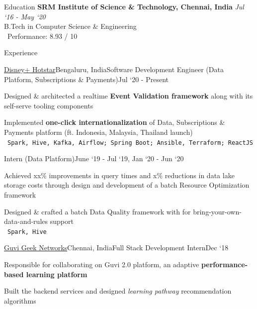\documentclass{resume}
\begin{document}
  \begin{rSection}{Education}
    {\bf SRM Institute of Science \& Technology, Chennai, India} \hfill {\em Jul `16 - May `20} \\ 
    { B.Tech in Computer Science \& Engineering } \\
    \textbullet\ Performance: 8.93 / 10
    
  \end{rSection}
  
  \begin{rSection}{Experience}
  
    \begin{rSubsection}{\href{https://tech.hotstar.com/}{Disney+ Hotstar}}{Bengaluru, India}{Software Development Engineer (Data Platform, Subscriptions \& Payments)}{Jul `20 - Present}
      \item Designed \& architected a realtime \textbf{Event Validation framework} along with its self-serve tooling components
      \item Implemented \textbf{one-click internationalization} of Data, Subscriptions \& Payments platform (ft. Indonesia, Malaysia, Thailand launch)\\
    \textbullet\ \texttt{Spark, Hive, Kafka, Airflow; Spring Boot; Ansible, Terraform; ReactJS}
    \end{rSubsection}
    
    \vspace*{-\baselineskip}

    \begin{rSubsection}{}{}{Intern (Data Platform)}{June `19 - Jul `19, Jan `20 - Jun `20}
    \item Achieved xx\% improvements in query times and x\% reductions in data lake storage costs through design and development of a batch Resource Optimization framework
    \item Designed \& crafted a batch Data Quality framework with for bring-your-own-data-and-rules support\\
    \textbullet\ \texttt{Spark, Hive}
    \end{rSubsection}

    \begin{rSubsection}{\href{https://www.guvi.in/}{Guvi Geek Networks}}{Chennai, India}{Full Stack Development Intern}{Dec `18}
    \item Responsible for collaborating on Guvi 2.0 platform, an adaptive \textbf{performance-based learning platform}
    \item Built the backend services and designed \textit{learning pathway} recommendation algorithms
    \end{rSubsection}
    \vspace*{-\baselineskip}


\end{rSection}
\end{document}
